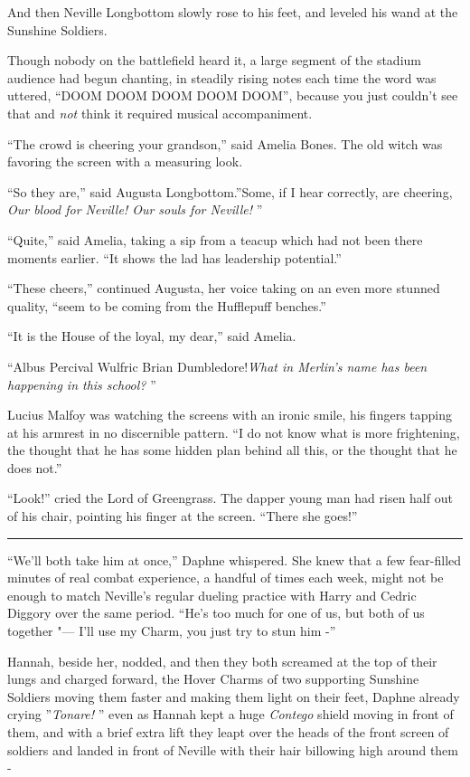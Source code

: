 And then Neville Longbottom slowly rose to his feet, and leveled his
wand at the Sunshine Soldiers.

Though nobody on the battlefield heard it, a large segment of the
stadium audience had begun chanting, in steadily rising notes each time
the word was uttered, ``DOOM DOOM DOOM DOOM DOOM'', because you just
couldn't see that and \emph{not} think it required musical
accompaniment.

``The crowd is cheering your grandson,'' said Amelia Bones. The old
witch was favoring the screen with a measuring look.

``So they are,'' said Augusta Longbottom.''Some, if I hear correctly,
are cheering, \emph{Our blood for Neville! Our souls for Neville!} ''

``Quite,'' said Amelia, taking a sip from a teacup which had not been
there moments earlier. ``It shows the lad has leadership potential.''

``These cheers,'' continued Augusta, her voice taking on an even more
stunned quality, ``seem to be coming from the Hufflepuff benches.''

``It is the House of the loyal, my dear,'' said Amelia.

``Albus Percival Wulfric Brian Dumbledore!\emph{What in Merlin's name has
been happening in this school?} ''

Lucius Malfoy was watching the screens with an ironic smile, his fingers
tapping at his armrest in no discernible pattern. ``I do not know what
is more frightening, the thought that he has some hidden plan behind all
this, or the thought that he does not.''

``Look!'' cried the Lord of Greengrass. The dapper young man had risen
half out of his chair, pointing his finger at the screen. ``There she
goes!''

\begin{center}\rule{3in}{0.4pt}\end{center}

``We'll both take him at once,'' Daphne whispered. She knew that a few
fear-filled minutes of real combat experience, a handful of times each
week, might not be enough to match Neville's regular dueling practice
with Harry and Cedric Diggory over the same period. ``He's too much for
one of us, but both of us together "--- I'll use my Charm, you just try to
stun him -''

Hannah, beside her, nodded, and then they both screamed at the top of
their lungs and charged forward, the Hover Charms of two supporting
Sunshine Soldiers moving them faster and making them light on their
feet, Daphne already crying ''\emph{Tonare!} '' even as Hannah kept a huge
\emph{Contego} shield moving in front of them, and with a brief extra
lift they leapt over the heads of the front screen of soldiers and
landed in front of Neville with their hair billowing high around them -


